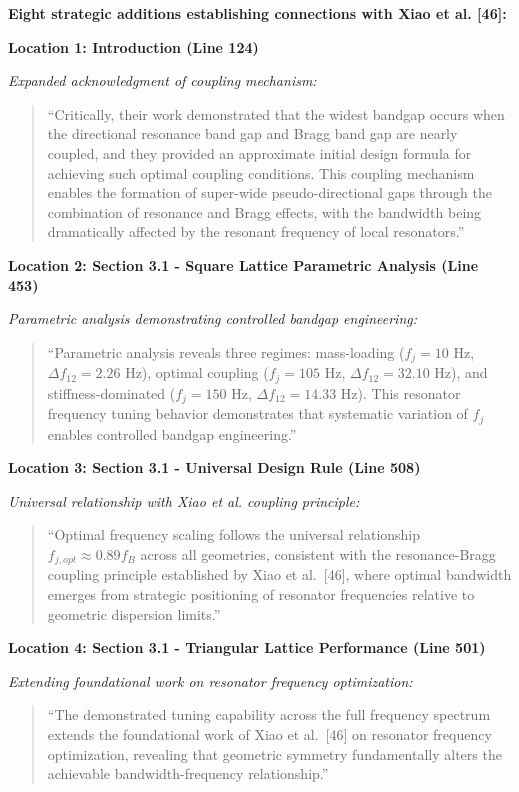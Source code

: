 \documentclass[11pt,a4paper]{article}
\newenvironment{changesbox}{%
    \par\medskip\noindent{\color{changescolor}\rule{\linewidth}{2pt}}\par
    \noindent{\color{changescolor}\bfseries Manuscript Changes}\par\smallskip
}{%
    \par\noindent{\color{changescolor}\rule{\linewidth}{0.5pt}}\medskip
}
\begin{document}
\begin{changesbox}
\textbf{Eight strategic additions establishing connections with Xiao et al. [46]:}

\textbf{Location 1: Introduction (Line 124)}

\textit{Expanded acknowledgment of coupling mechanism:}
\begin{quote}
\textcolor{redtext}{``Critically, their work demonstrated that the widest bandgap occurs when the directional resonance band gap and Bragg band gap are nearly coupled, and they provided an approximate initial design formula for achieving such optimal coupling conditions. This coupling mechanism enables the formation of super-wide pseudo-directional gaps through the combination of resonance and Bragg effects, with the bandwidth being dramatically affected by the resonant frequency of local resonators.''}
\end{quote}

\textbf{Location 2: Section 3.1 - Square Lattice Parametric Analysis (Line 453)}

\textit{Parametric analysis demonstrating controlled bandgap engineering:}
\begin{quote}
\textcolor{redtext}{``Parametric analysis reveals three regimes: mass-loading ($f_j = 10$ Hz, $\Delta f_{12} = 2.26$ Hz), optimal coupling ($f_j = 105$ Hz, $\Delta f_{12} = 32.10$ Hz), and stiffness-dominated ($f_j = 150$ Hz, $\Delta f_{12} = 14.33$ Hz). This resonator frequency tuning behavior demonstrates that systematic variation of $f_j$ enables controlled bandgap engineering.''}
\end{quote}

\textbf{Location 3: Section 3.1 - Universal Design Rule (Line 508)}

\textit{Universal relationship with Xiao et al. coupling principle:}
\begin{quote}
\textcolor{redtext}{``Optimal frequency scaling follows the universal relationship $f_{j,opt} \approx 0.89 f_B$ across all geometries, consistent with the resonance-Bragg coupling principle established by Xiao et al.~[46], where optimal bandwidth emerges from strategic positioning of resonator frequencies relative to geometric dispersion limits.''}
\end{quote}

\textbf{Location 4: Section 3.1 - Triangular Lattice Performance (Line 501)}

\textit{Extending foundational work on resonator frequency optimization:}
\begin{quote}
\textcolor{redtext}{``The demonstrated tuning capability across the full frequency spectrum extends the foundational work of Xiao et al.~[46] on resonator frequency optimization, revealing that geometric symmetry fundamentally alters the achievable bandwidth-frequency relationship.''}
\end{quote}


\end{changesbox}
\end{document}
